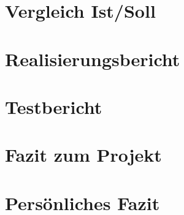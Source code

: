 \section{Vergleich Ist/Soll} 

\section{Realisierungsbericht}

\section{Testbericht}

\section{Fazit zum Projekt}

\section{Persönliches Fazit}
